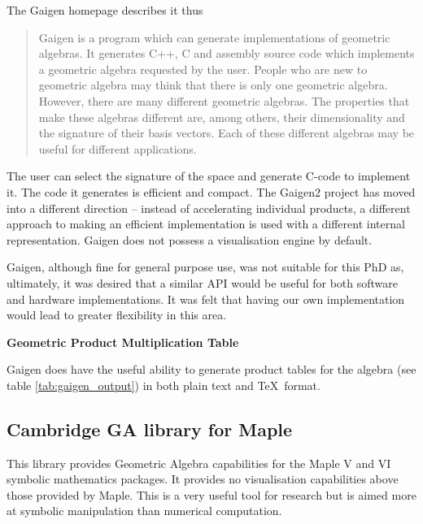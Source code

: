 The Gaigen 
homepage\cite{Gaigen} describes 
it thus
\begin{quote}
Gaigen is a program which can generate implementations of geometric algebras. It generates C++, C and assembly source code which implements a geometric algebra requested by the user. People who are new to geometric algebra may think that there is only one geometric algebra. However, there are many different geometric algebras. The properties that make these algebras different are, among others, their dimensionality and the signature of their basis vectors. Each of these different algebras may be useful for different applications.
\end{quote}
The user can select the signature of the space and generate C-code to implement
it. The code it generates is efficient and compact. The Gaigen2 project has
moved into a different direction -- instead of accelerating individual products, a
different approach to making an efficient implementation is used with a
different internal representation. Gaigen does not possess a visualisation
engine by default.

Gaigen, although fine for general purpose use, was not suitable for this
PhD as, ultimately, it was desired that a similar API would be useful for
both software and hardware implementations. It was felt that having our
own implementation would lead to greater flexibility in this area.

\begin{table}
\centering
\textbf{Geometric Product Multiplication Table}\\
\rule{0cm}{0.3cm}

\caption{Example \TeX\ output from Gaigen\label{tab:gaigen_output}}
\end{table}

Gaigen does have the useful ability to generate product tables for the algebra
(see table \ref{tab:gaigen_output}) in both plain text and \TeX\ format. 

\subsection{Cambridge GA library for Maple}

This library\cite{GA:CambridgeGALibrary} provides Geometric Algebra
capabilities for the Maple V and VI symbolic mathematics packages. It provides
no visualisation capabilities above those provided by Maple. This is a very
useful tool for research but is aimed more at symbolic manipulation than
numerical computation.

